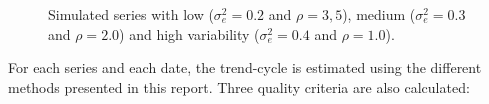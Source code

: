 \documentclass[
]{article}
\newcommand\1{\mathds{1}}
\begin{document}
\begin{figure}[H]

\caption{\label{fig-graphs-data-simul}Simulated series with low
(\(\sigma_e^2=0.2\) and \(\rho = 3,5\)), medium (\(\sigma_e^2=0.3\) and
\(\rho = 2.0\)) and high variability (\(\sigma_e^2=0.4\) and
\(\rho = 1.0\)).}


\end{figure}%

For each series and each date, the trend-cycle is estimated using the
different methods presented in this report. Three quality criteria are
also calculated:
\end{document}

